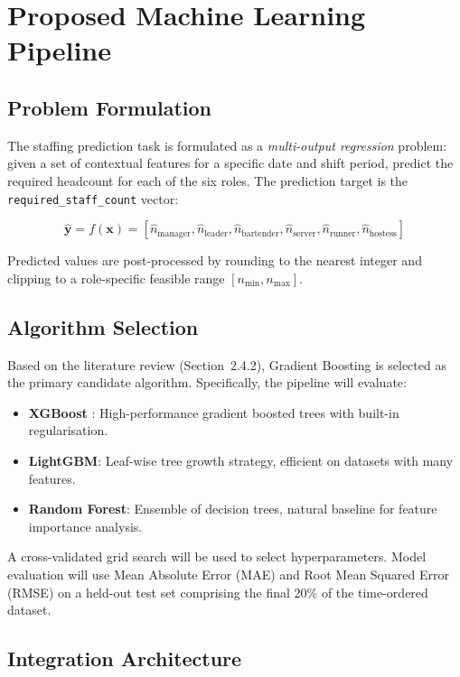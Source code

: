 \section{Proposed Machine Learning Pipeline}

\subsection{Problem Formulation}

The staffing prediction task is formulated as a \textit{multi-output regression} problem: given a set of contextual features for a specific date and shift period, predict the required headcount for each of the six roles. The prediction target is the \texttt{required\_staff\_count} vector:

\[
\hat{\mathbf{y}} = f(\mathbf{x}) = [\hat{n}_{\text{manager}}, \hat{n}_{\text{leader}}, \hat{n}_{\text{bartender}}, \hat{n}_{\text{server}}, \hat{n}_{\text{runner}}, \hat{n}_{\text{hostess}}]
\]

Predicted values are post-processed by rounding to the nearest integer and clipping to a role-specific feasible range $[n_{\min}, n_{\max}]$.

\subsection{Algorithm Selection}

Based on the literature review (Section~2.4.2), Gradient Boosting is selected as the primary candidate algorithm. Specifically, the pipeline will evaluate:

\begin{itemize}
    \item \textbf{XGBoost} \cite{chen_guestrin_2016}: High-performance gradient boosted trees with built-in regularisation.
    \item \textbf{LightGBM}: Leaf-wise tree growth strategy, efficient on datasets with many features.
    \item \textbf{Random Forest}: Ensemble of decision trees, natural baseline for feature importance analysis.
\end{itemize}

A cross-validated grid search will be used to select hyperparameters. Model evaluation will use Mean Absolute Error (MAE) and Root Mean Squared Error (RMSE) on a held-out test set comprising the final 20\% of the time-ordered dataset.

\subsection{Integration Architecture}

